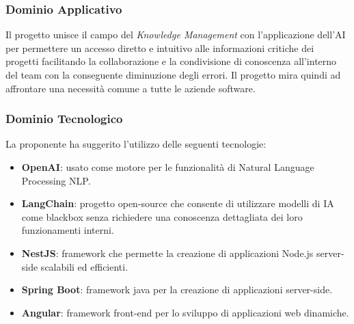 \documentclass[a4paper, 12pt]{article}
\begin{document}
\subsubsection{Dominio Applicativo}
Il progetto unisce il campo del \textit{Knowledge Management} con l’applicazione dell’AI per permettere un accesso diretto e intuitivo alle informazioni critiche dei progetti facilitando la collaborazione e la condivisione di conoscenza all’interno del team con la conseguente diminuzione degli errori.
Il progetto mira quindi ad affrontare una necessità comune a tutte le aziende software.

\subsubsection{Dominio Tecnologico}
La proponente ha suggerito l’utilizzo delle seguenti tecnologie:
\begin{itemize}
    \item \textbf{OpenAI}: usato come motore per le funzionalità di Natural Language Processing NLP.
    \item \textbf{LangChain}: progetto open-source che consente di utilizzare modelli di IA come blackbox senza richiedere una conoscenza dettagliata dei loro funzionamenti interni.
    \item \textbf{NestJS}: framework che permette la creazione di applicazioni Node.js server-side scalabili ed efficienti.
    \item \textbf{Spring Boot}: framework java per la creazione di applicazioni server-side.
    \item \textbf{Angular}: framework front-end per lo sviluppo di applicazioni web dinamiche.
    
\end{itemize}
\end{document}
